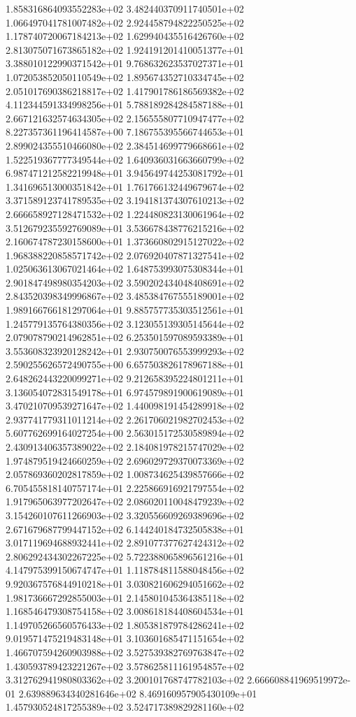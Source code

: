 1.858316864093552283e+02 3.482440370911740501e+02 1.066497041781007482e+02
2.924458794822250525e+02 1.178740720067184213e+02 1.629940435516426760e+02
2.813075071673865182e+02 1.924191201410051377e+01 3.388010122990371542e+01
9.768632623537027371e+01 1.072053852050110549e+02 1.895674352710334745e+02
2.051017690386218817e+02 1.417901786186569382e+02 4.112344591334998256e+01
5.788189284284587188e+01 2.667121632574634305e+02 2.156555807710947477e+02
8.227357361196414587e+00 7.186755395566744653e+01 2.899024355510466080e+02
2.384514699779668661e+02 1.522519367777349544e+02 1.640936031663660799e+02
6.987471212582219948e+01 3.945649744253081792e+01 1.341696513000351842e+01
1.761766132449679674e+02 3.371589123741789535e+02 3.194181374307610213e+02
2.666658927128471532e+02 1.224480823130061964e+02 3.512679235592769089e+01
3.536678438776215216e+02 2.160674787230158600e+01 1.373660802915127022e+02
1.968388220858571742e+02 2.076920407871327541e+02 1.025063613067021464e+02
1.648753993075308344e+01 2.901847498980354203e+02 3.590202434048408691e+02
2.843520398349996867e+02 3.485384767555189001e+02 1.989166766181297064e+01
9.885757735303512561e+01 1.245779135764380356e+02 3.123055139305145644e+02
2.079078790214962851e+02 6.253501597089593389e+01 3.553608323920128242e+01
2.930750076553999293e+02 2.590255626572490755e+00 6.657503826178967188e+01
2.648262443220099271e+02 9.212658395224801211e+01 3.136054072831549178e+01
6.974579891900619089e+01 3.470210709539271647e+02 1.440098191454289918e+02
2.937741779311011214e+02 2.261706021982702453e+02 5.607762699164027254e+00
2.563015172530589894e+02 2.430913406357389022e+02 2.184081978215747029e+02
1.974879519424660259e+02 2.696029729370073369e+02 2.057869360202817859e+02
1.008734625439857666e+02 6.705455818140757174e+01 2.225866916921797554e+02
1.917965063977202647e+02 2.086020110048479239e+02 3.154260107611266903e+02
3.320556609269389696e+02 2.671679687799447152e+02 6.144240184732505838e+01
3.017119694688932441e+02 2.891077377627424312e+02 2.806292434302267225e+02
5.722388065896561216e+01 4.147975399150674747e+01 1.118784811588048456e+02
9.920367576844910218e+01 3.030821606294051662e+02 1.981736667292855003e+01
2.145801045364385118e+02 1.168546479308754158e+02 3.008618184408604534e+01
1.149705266560576433e+02 1.805381879784286241e+02 9.019571475219483148e+01
3.103601685471151654e+02 1.466707594260903988e+02 3.527539382769763847e+02
1.430593789423221267e+02 3.578625811161954857e+02 3.312762941980803362e+02
3.200101768747782103e+02 2.666608841969519972e-01 2.639889634340281646e+02
8.469160957905430109e+01 1.457930524817255389e+02 3.524717389829281160e+02
